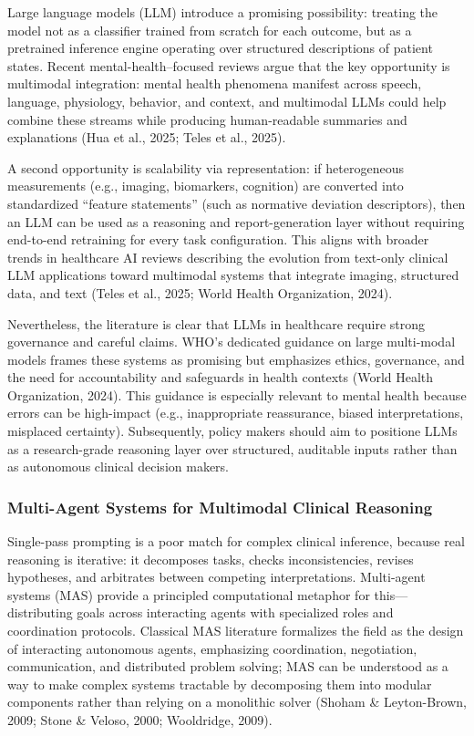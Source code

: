 \documentclass[11pt,a4paper,twoside]{article}
\begin{document}
Large language models (LLM) introduce a promising possibility: treating the model not as a classifier trained from scratch for each outcome, but as a pretrained inference engine operating over structured descriptions of patient states. Recent mental-health--focused reviews argue that the key opportunity is multimodal integration: mental health phenomena manifest across speech, language, physiology, behavior, and context, and multimodal LLMs could help combine these streams while producing human-readable summaries and explanations (Hua et al., 2025; Teles et al., 2025).

A second opportunity is scalability via representation: if heterogeneous measurements (e.g., imaging, biomarkers, cognition) are converted into standardized ``feature statements'' (such as normative deviation descriptors), then an LLM can be used as a reasoning and report-generation layer without requiring end-to-end retraining for every task configuration. This aligns with broader trends in healthcare AI reviews describing the evolution from text-only clinical LLM applications toward multimodal systems that integrate imaging, structured data, and text (Teles et al., 2025; World Health Organization, 2024).

Nevertheless, the literature is clear that LLMs in healthcare require strong governance and careful claims. WHO's dedicated guidance on large multi-modal models frames these systems as promising but emphasizes ethics, governance, and the need for accountability and safeguards in health contexts (World Health Organization, 2024). This guidance is especially relevant to mental health because errors can be high-impact (e.g., inappropriate reassurance, biased interpretations, misplaced certainty). Subsequently, policy makers should aim to positione LLMs as a research-grade reasoning layer over structured, auditable inputs rather than as autonomous clinical decision makers.

\subsubsection{Multi-Agent Systems for Multimodal Clinical Reasoning}

Single-pass prompting is a poor match for complex clinical inference, because real reasoning is iterative: it decomposes tasks, checks inconsistencies, revises hypotheses, and arbitrates between competing interpretations. Multi-agent systems (MAS) provide a principled computational metaphor for this---distributing goals across interacting agents with specialized roles and coordination protocols. Classical MAS literature formalizes the field as the design of interacting autonomous agents, emphasizing coordination, negotiation, communication, and distributed problem solving; MAS can be understood as a way to make complex systems tractable by decomposing them into modular components rather than relying on a monolithic solver (Shoham \& Leyton-Brown, 2009; Stone \& Veloso, 2000; Wooldridge, 2009).
\end{document}
